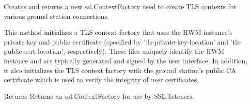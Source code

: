Creates and returns a new ssl.\-Context\-Factory used to create T\-L\-S contexts for various ground station connections. 

This method initializes a T\-L\-S context factory that uses the H\-W\-M instance's private key and public certificate (specified by 'tls-\/private-\/key-\/location' and 'tls-\/public-\/cert-\/location', respectively). These files uniquely identify the H\-W\-M instance and are typically generated and signed by the user interface. In addition, it also initializes the T\-L\-S context factory with the ground station's public C\-A certificate which is used to verify the integrity of user certificates.

\begin{DoxyReturn}{Returns}
Returns an ssl.\-Context\-Factory for use by S\-S\-L listeners. 
\end{DoxyReturn}
